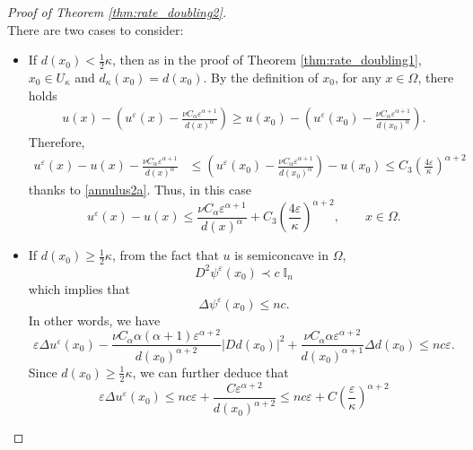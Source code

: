 \documentclass[12pt,reqno]{amsart}
\numberwithin{figure}{section}
\theoremstyle{plain}
\theoremstyle{remark}
\numberwithin{equation}{section}
\begin{document}
\begin{proof}[Proof of Theorem \ref{thm:rate_doubling2}]
\begin{equation*}
\end{equation*}
There are two cases to consider:
\begin{itemize}
    \item If $\displaystyle d(x_0)< \frac{1}{2}\kappa$, then as in the proof of Theorem \ref{thm:rate_doubling1}, $x_0\in U_\kappa$ and $d_\kappa(x_0) = d(x_0)$. By the definition of $x_0$, for any $x\in \Omega$, there holds
    \begin{align*}
        u(x) - \left(u^\varepsilon(x) - \frac{\nu C_\alpha \varepsilon^{\alpha+1}}{d(x)^\alpha}\right) \geq u(x_0) - \left(u^\varepsilon(x_0) - \frac{\nu C_\alpha \varepsilon^{\alpha+1}}{d(x_0)^\alpha}\right).
    \end{align*}
    Therefore,
    \begin{equation*}
    \begin{split}
        u^\varepsilon(x) - u(x) - \frac{\nu C_\alpha \varepsilon^{\alpha+1}}{d(x)^\alpha} &\leq  \left(u^\varepsilon(x_0) - \frac{\nu C_\alpha \varepsilon^{\alpha+1}}{d(x_0)^\alpha}\right) - u(x_0) \leq C_3 \left(\frac{4\varepsilon}{\kappa}\right)^{\alpha+2}
    \end{split}
    \end{equation*}
    thanks to \eqref{annulus2a}. Thus, in this case
    \begin{equation*}
        u^\varepsilon(x) - u(x) \leq \frac{\nu C_\alpha \varepsilon^{\alpha+1}}{d(x)^\alpha} + C_3 \left(\frac{4\varepsilon}{\kappa}\right)^{\alpha+2}, \qquad x\in \Omega.
    \end{equation*}
    \item If $\displaystyle d(x_0) \geq \frac{1}{2}\kappa$, from the fact that $u$ is semiconcave in $\Omega$, 
\begin{equation*}
    D^2\psi^\varepsilon(x_0) \prec c\;\mathbb{I}_n
\end{equation*}
which implies that
\begin{equation*}
    \Delta \psi^\varepsilon(x_0) \leq nc.
\end{equation*}
In other words, we have
\begin{equation*}
    \varepsilon\Delta u^\varepsilon (x_0) - \frac{\nu C_\alpha \alpha(\alpha+1)\varepsilon^{\alpha+2}}{d(x_0)^{\alpha+2}}| Dd(x_0)|^2 + \frac{\nu C_\alpha \alpha \varepsilon^{\alpha+2}}{d(x_0)^{\alpha+1}}\Delta d(x_0) \leq nc\varepsilon.
\end{equation*}
Since $d(x_0)\geq \frac{1}{2}\kappa$, we can further deduce that
\begin{equation}\label{delta_psi}
    \varepsilon\Delta u^\varepsilon(x_0) \leq nc\varepsilon + \frac{C\varepsilon^{\alpha+2}}{d(x_0)^{\alpha+2}} \leq nc\varepsilon +  C\left(\frac{\varepsilon}{\kappa}\right)^{\alpha+2}

\end{equation}
\end{itemize}
\end{proof}
\end{document}
